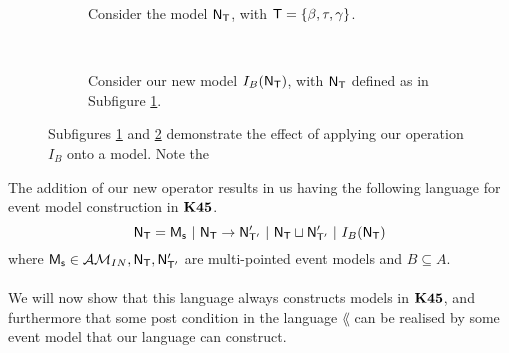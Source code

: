 \begin{figure}[ht!]
\centering
\begin{subfigure}[b]{.45\textwidth}
\centering
{}
\caption{Consider the model $\mathrm{\mathsf{N}}_\mathrm{\mathsf{T}}$, with $\mathrm{\mathsf{T}} = \{\beta, \tau, \gamma\}$.}
\label{beforeOperation}
\end{subfigure}
~
\begin{subfigure}[b]{.45\textwidth}
\centering
{}
\caption{Consider our new model $I_B(\mathrm{\mathsf{N}}_\mathrm{\mathsf{T}})$, with $\mathrm{\mathsf{N}}_\mathrm{\mathsf{T}}$ defined as in Subfigure
\ref{beforeOperation}.}
\label{afterOperation}
\end{subfigure}
\caption{Subfigures \ref{beforeOperation} and \ref{afterOperation} demonstrate the effect of
applying our operation $I_B$ onto a model.
Note the }
\label{k45VsKModels}
\end{figure}

The addition of our new operator results in us having the following language for
event model construction in $\bf K45$.
\[
	\mathrm{\mathsf{N}}_\mathrm{\mathsf{T}} = \mathrm{\mathsf{M_s}} \text{ } | \text{ }\mathrm{\mathsf{N}}_\mathrm{\mathsf{T}} \to \mathrm{\mathsf{N}}'_{\mathrm{\mathsf{T}}'} \text{ }|
  \text{ } \mathrm{\mathsf{N}}_\mathrm{\mathsf{T}} \sqcup \mathrm{\mathsf{N}}'_{\mathrm{\mathsf{T}}'} \text{ } | \text{ } I_B(\mathrm{\mathsf{N}}_\mathrm{\mathsf{T}})
\]
where $\mathrm{\mathsf{M_s}} \in \mathcal{AM}_{IN}, \mathrm{\mathsf{N}}_\mathrm{\mathsf{T}}, \mathrm{\mathsf{N}}'_{\mathrm{\mathsf{T}}'}$ are multi-pointed event models and $B \subseteq
A$.\\
\\
We will now show that this language always constructs models in $\bf K45$, and
furthermore that some post condition in the language $\lang$ can be realised by
some event model that our language can construct.

